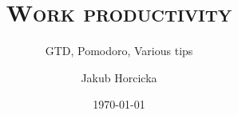 \documentclass[xcolor=dvipsnames]{beamer}
\author{Jakub Horcicka}
\title{\textsc{Work productivity}}
\subtitle{GTD, Pomodoro, Various tips}
\date{\today}
\begin{document}
 
  \begin{frame}
    \titlepage
  \end{frame}

  
  
  
  
\end{document}
